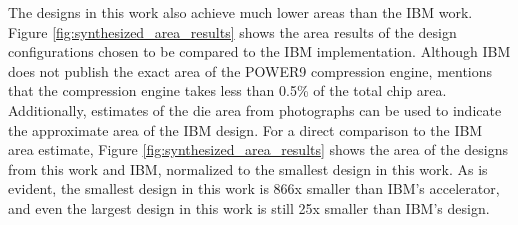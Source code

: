 \documentclass[doublespace,nopageskip]{VTthesis}
\begin{document}
The designs in this work also achieve much lower areas than the IBM work. Figure \ref{fig:synthesized_area_results} shows the area results of the design configurations chosen to be compared to the IBM implementation. Although IBM does not publish the exact area of the POWER9 compression engine, \cite{ibm} mentions that the compression engine takes less than 0.5\% of the total chip area. Additionally, estimates of the die area from photographs can be used to indicate the approximate area of the IBM design\cite{wikichip-ibm-area}. For a direct comparison to the IBM area estimate, Figure \ref{fig:synthesized_area_results} shows the area of the designs from this work and IBM, normalized to the smallest design in this work. As is evident, the smallest design in this work is 866x smaller than IBM's accelerator, and even the largest design in this work is still 25x smaller than IBM's design. 
\end{document}
